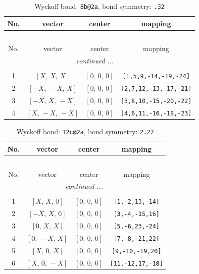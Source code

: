 \documentclass[fleqn,8pt]{jsarticle}
\begin{document}
\begin{longtable}{cccc}
\caption{Wyckoff bond: {\tt 8b@2a}, bond symmetry: {\tt .32}}
 \\
 \hline \hline
No. & vector & center & mapping \\ \hline \endfirsthead

\multicolumn{3}{l}{\tablename\ \thetable{}} \\
 \hline \hline
No. & vector & center & mapping \\ \hline \endhead

 \hline \hline
\multicolumn{3}{r}{\footnotesize\it continued ...} \\ \endfoot

 \hline \hline
\multicolumn{3}{r}{} \\ \endlastfoot

1 & $\left[ X,\, X,\, X \right]$ & $\left[ 0,\, 0,\, 0 \right]$ & {\tt [1,5,9,-14,-19,-24]} \\ \hline
2 & $\left[ - X,\, - X,\, X \right]$ & $\left[ 0,\, 0,\, 0 \right]$ & {\tt [2,7,12,-13,-17,-21]} \\ \hline
3 & $\left[ - X,\, X,\, - X \right]$ & $\left[ 0,\, 0,\, 0 \right]$ & {\tt [3,8,10,-15,-20,-22]} \\ \hline
4 & $\left[ X,\, - X,\, - X \right]$ & $\left[ 0,\, 0,\, 0 \right]$ & {\tt [4,6,11,-16,-18,-23]} \\
\end{longtable}
\renewcommand{\arraystretch}{1.2}
\begin{longtable}{cccc}
\caption{Wyckoff bond: {\tt 12c@2a}, bond symmetry: {\tt 2.22}}
 \\
 \hline \hline
No. & vector & center & mapping \\ \hline \endfirsthead

\multicolumn{3}{l}{\tablename\ \thetable{}} \\
 \hline \hline
No. & vector & center & mapping \\ \hline \endhead

 \hline \hline
\multicolumn{3}{r}{\footnotesize\it continued ...} \\ \endfoot

 \hline \hline
\multicolumn{3}{r}{} \\ \endlastfoot

1 & $\left[ X,\, X,\, 0 \right]$ & $\left[ 0,\, 0,\, 0 \right]$ & {\tt [1,-2,13,-14]} \\ \hline
2 & $\left[ - X,\, X,\, 0 \right]$ & $\left[ 0,\, 0,\, 0 \right]$ & {\tt [3,-4,-15,16]} \\ \hline
3 & $\left[ 0,\, X,\, X \right]$ & $\left[ 0,\, 0,\, 0 \right]$ & {\tt [5,-6,23,-24]} \\ \hline
4 & $\left[ 0,\, - X,\, X \right]$ & $\left[ 0,\, 0,\, 0 \right]$ & {\tt [7,-8,-21,22]} \\ \hline
5 & $\left[ X,\, 0,\, X \right]$ & $\left[ 0,\, 0,\, 0 \right]$ & {\tt [9,-10,-19,20]} \\ \hline
6 & $\left[ X,\, 0,\, - X \right]$ & $\left[ 0,\, 0,\, 0 \right]$ & {\tt [11,-12,17,-18]} \\
\end{longtable}
\end{document}
